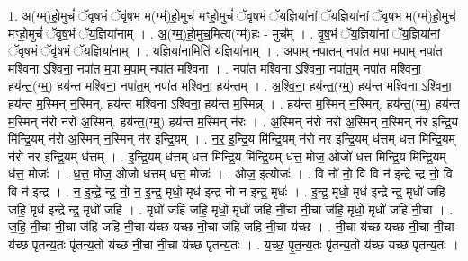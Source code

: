 \documentclass[17pt]{extarticle}
\begin{document}
1. अ॒(ग्म्॒)हो॒मुचं॑ ॅवृष॒भं ॅवृ॑ष॒भ म(ग्म्॑)हो॒मुच॑ मꣳहो॒मुचं॑ ॅवृष॒भं ॅय॒ज्ञिया॑नां ॅय॒ज्ञिया॑नां ॅवृष॒भ म(ग्म्॑)हो॒मुच॑ मꣳहो॒मुचं॑ ॅवृष॒भं ॅय॒ज्ञिया॑नाम् । . अ॒(ग्म्॒)हो॒मुच॒मित्य(ग्म्॑)हः - मुच᳚म् । . वृ॒ष॒भं ॅय॒ज्ञिया॑नां ॅय॒ज्ञिया॑नां ॅवृष॒भं ॅवृ॑ष॒भं ॅय॒ज्ञिया॑नाम् । . य॒ज्ञिया॑ना॒मिति॑ य॒ज्ञिया॑नाम् । . अ॒पाम् नपा॑त॒म् नपा॑त म॒पा म॒पाम् नपा॑त मश्विना ऽश्विना॒ नपा॑त म॒पा म॒पाम् नपा॑त मश्विना । . नपा॑त मश्विना ऽश्विना॒ नपा॑त॒म् नपा॑त मश्विना॒ हय॑न्त॒(ग्म्॒) हय॑न्त मश्विना॒ नपा॑त॒म् नपा॑त मश्विना॒ हय॑न्तम् । . अ॒श्वि॒ना॒ हय॑न्त॒(ग्म्॒) हय॑न्त मश्विना ऽश्विना॒ हय॑न्त म॒स्मिन् न॒स्मिन्. हय॑न्त मश्विना ऽश्विना॒ हय॑न्त म॒स्मिन्न् । . हय॑न्त म॒स्मिन् न॒स्मिन्. हय॑न्त॒(ग्म्॒) हय॑न्त म॒स्मिन् न॑रो नरो अ॒स्मिन्. हय॑न्त॒(ग्म्॒) हय॑न्त म॒स्मिन् न॑रः । . अ॒स्मिन् न॑रो नरो अ॒स्मिन् न॒स्मिन् न॑र इन्द्रि॒य मि॑न्द्रि॒यम् न॑रो अ॒स्मिन् न॒स्मिन् न॑र इन्द्रि॒यम् । . न॒र॒ इ॒न्द्रि॒य मि॑न्द्रि॒यम् न॑रो नर इन्द्रि॒यम् ध॑त्तम् धत्त मिन्द्रि॒यम् न॑रो नर इन्द्रि॒यम् ध॑त्तम् । . इ॒न्द्रि॒यम् ध॑त्तम् धत्त मिन्द्रि॒य मि॑न्द्रि॒यम् ध॑त्त॒ मोज॒ ओजो॑ धत्त मिन्द्रि॒य मि॑न्द्रि॒यम् ध॑त्त॒ मोजः॑ । . ध॒त्त॒ मोज॒ ओजो॑ धत्तम् धत्त॒ मोजः॑ । . ओज॒ इत्योजः॑ । . वि नो॑ नो॒ वि वि न॑ इन्द्रे न्द्र नो॒ वि वि न॑ इन्द्र । . न॒ इ॒न्द्रे॒ न्द्र॒ नो॒ न॒ इ॒न्द्र॒ मृधो॒ मृध॑ इन्द्र नो न इन्द्र॒ मृधः॑ । . इ॒न्द्र॒ मृधो॒ मृध॑ इन्द्रे न्द्र॒ मृधो॑ जहि जहि॒ मृध॑ इन्द्रे न्द्र॒ मृधो॑ जहि । . मृधो॑ जहि जहि॒ मृधो॒ मृधो॑ जहि नी॒चा नी॒चा ज॑हि॒ मृधो॒ मृधो॑ जहि नी॒चा । . ज॒हि॒ नी॒चा नी॒चा ज॑हि जहि नी॒चा य॑च्छ यच्छ नी॒चा ज॑हि जहि नी॒चा य॑च्छ । . नी॒चा य॑च्छ यच्छ नी॒चा नी॒चा य॑च्छ पृतन्य॒तः पृ॑तन्य॒तो य॑च्छ नी॒चा नी॒चा य॑च्छ पृतन्य॒तः । . य॒च्छ॒ पृ॒त॒न्य॒तः पृ॑तन्य॒तो य॑च्छ यच्छ पृतन्य॒तः । \newline
\end{document}
